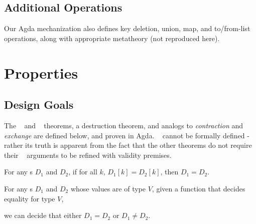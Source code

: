 
\subsection{Additional Operations}

Our Agda mechanization also defines key deletion, union, map, and to/from-list operations, along
with appropriate metatheory (not reproduced here).



\section{Properties}
\label{sec:DD:props}

\subsection{Design Goals}

The \SemInj~ and \EqDec~ theorems, a destruction theorem, and analogs to \emph{contraction} and
\emph{exchange} are defined below, and proven in Agda. \SemTot~ cannot be formally defined - rather
its truth is apparent from the fact that the other theorems do not require their \dd~ arguments to
be refined with validity premises.

\begin{proposition}[\SemTot]

\breakAndIndent
%

\end{proposition}

\begin{theorem}[\SemInj]
\label{thm:SemInj}

\breakAndIndent
%
For any {\dd}s $D_1$ and $D_2$,
%
if for all $k$, $D_1[k] = D_2[k]$,
%
then $D_1 = D_2$.

\end{theorem}

\begin{theorem}[\EqDec]
\label{thm:EqDec}

\breakAndIndent
%
For any {\dd}s $D_1$ and $D_2$ whose values are of type $V$,
%
given a function that decides equality for type $V$,
%

\justIndent
%
we can decide that either $D_1 = D_2$ or $D_1 \ne D_2$.

\end{theorem}

